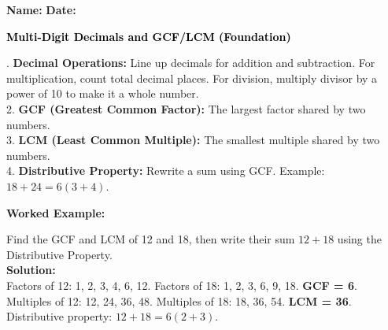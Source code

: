 \documentclass[12pt, letterpaper, fleqn]{article}
\begin{document}
\textbf{Name:} \underline{\hspace{5cm}}
\hfill
\textbf{Date:} \underline{\hspace{3cm}}\\

\begin{tcolorbox}[colback=black!10]
    \large\textcolor{black}{\textbf{Multi-Digit Decimals and GCF/LCM (Foundation)}}
\end{tcolorbox}

\vspace{3mm}

. \textbf{Decimal Operations:} Line up decimals for addition and subtraction. For multiplication, count total decimal places. For division, multiply divisor by a power of 10 to make it a whole number. \\
2. \textbf{GCF (Greatest Common Factor):} The largest factor shared by two numbers. \\
3. \textbf{LCM (Least Common Multiple):} The smallest multiple shared by two numbers. \\
4. \textbf{Distributive Property:} Rewrite a sum using GCF. Example: $18 + 24 = 6(3 + 4)$.

\vspace{4mm}

\begin{tcolorbox}[colback=white, colframe=black!25, boxrule=0.6pt, arc=4mm, left=6mm, right=6mm, top=5mm, bottom=5mm]
\textbf{Worked Example:}

\medskip
\noindent
Find the GCF and LCM of 12 and 18, then write their sum $12 + 18$ using the Distributive Property.\\
\textbf{Solution:} \\
Factors of 12: 1, 2, 3, 4, 6, 12. Factors of 18: 1, 2, 3, 6, 9, 18. \textbf{GCF = 6}.\\
Multiples of 12: 12, 24, 36, 48. Multiples of 18: 18, 36, 54. \textbf{LCM = 36}.\\
Distributive property: $12 + 18 = 6(2 + 3)$.
\end{tcolorbox}

\vspace{4mm}
\end{document}
